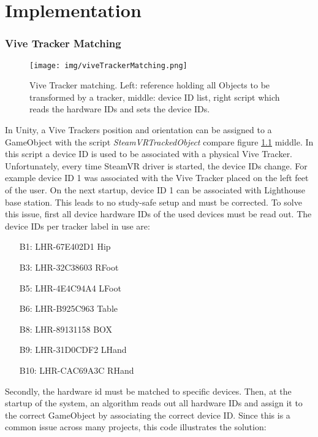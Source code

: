 \chapter{Implementation}

\subsection{Vive Tracker Matching}
\begin{figure}
	\centering
	\texttt{[image: img/viveTrackerMatching.png]}
	\caption{Vive Tracker matching. Left: reference holding all Objects to be transformed by a tracker, middle: device ID list, right script which reads the hardware IDs and sets the device IDs.}
	\label{fig:viveTrackerMatching}
\end{figure}
In Unity, a Vive Trackers position and orientation can be assigned to a GameObject with the script \textit{SteamVRTrackedObject} compare figure \ref{fig:viveTrackerMatching} middle. In this script a device ID is used to be associated with a physical Vive Tracker. Unfortunately, every time SteamVR driver is started, the device IDs change. For example device ID 1 was associated with the Vive Tracker placed on the left feet of the user. On the next startup, device ID 1 can be associated with Lighthouse base station. This leads to no study-safe setup and must be corrected. To solve this issue, first all device hardware IDs of the used devices must be read out. The device IDs per tracker label in use are:
\begin{itemize}
	\item[B1:] LHR-67E402D1 Hip
	\item[B3:] LHR-32C38603 RFoot
	\item[B5:] LHR-4E4C94A4 LFoot
	\item[B6:] LHR-B925C963 Table
	\item[B8:] LHR-89131158 BOX
	\item[B9:] LHR-31D0CDF2 LHand
	\item[B10:] LHR-CAC69A3C RHand
\end{itemize}
Secondly, the hardware id must be matched to specific devices. Then, at the startup of the system, an algorithm reads out all hardware IDs and assign it to the correct GameObject by associating the correct device ID. Since this is a common issue across many projects, this code illustrates the solution:

